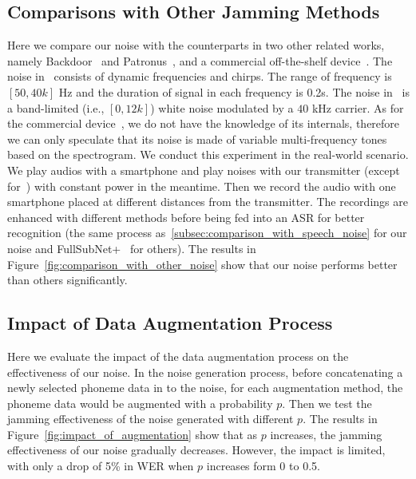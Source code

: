 \subsection{Comparisons with Other Jamming Methods}
Here we compare our noise with the counterparts in two other related works, namely Backdoor~\cite{backdoor} and Patronus~\cite{patronus}, and a commercial off-the-shelf device~\cite{commercial_device}. The noise in~\cite{patronus} consists of dynamic frequencies and chirps. The range of frequency is $[50, 40k]$ Hz and the duration of signal in each frequency is 0.2s. The noise in~\cite{backdoor} is a band-limited (i.e., $[0, 12k]$) white noise modulated by a $40$ kHz carrier. As for the commercial device~\cite{commercial_device}, we do not have the knowledge of its internals, therefore we can only speculate that its noise is made of variable multi-frequency tones based on the spectrogram. We conduct this experiment in the real-world scenario. We play audios with a smartphone and play noises with our transmitter (except for~\cite{commercial_device}) with constant power in the meantime. Then we record the audio with one smartphone placed at different distances from the transmitter. The recordings are enhanced with different methods before being fed into an ASR for better recognition (the same process as~\ref{subsec:comparison_with_speech_noise} for our noise and FullSubNet+~\cite{fullsubnetPlus} for others). The results in Figure~\ref{fig:comparison_with_other_noise} show that our noise performs better than others significantly.

\subsection{Impact of Data Augmentation Process}
Here we evaluate the impact of the data augmentation process on the effectiveness of our noise. In the noise generation process, before concatenating a newly selected phoneme data in to the noise, for each augmentation method, the phoneme data would be augmented with a probability $p$.
Then we test the jamming effectiveness of the noise generated with different $p$. The results in Figure~\ref{fig:impact_of_augmentation} show that as $p$ increases, the jamming effectiveness of our noise gradually decreases. However, the impact is limited, with only a drop of 5\% in WER when $p$ increases form 0 to 0.5.

